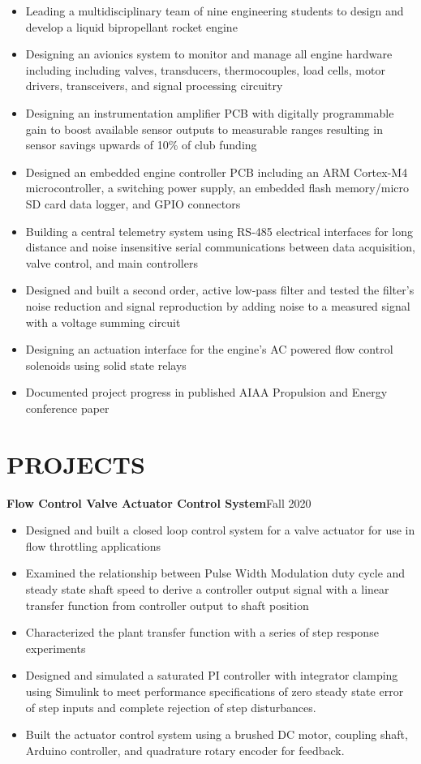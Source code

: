 \documentclass{article}
\begin{document}
\begin{itemize}
\item{Leading a multidisciplinary team of nine engineering students to design and develop a liquid bipropellant rocket engine}
	\item{Designing an avionics system to monitor and manage all engine hardware including including valves, transducers, thermocouples, load cells, motor drivers, transceivers, and signal processing circuitry}
	\item{Designing an instrumentation amplifier PCB with digitally programmable gain to boost available sensor outputs to measurable ranges resulting in sensor savings upwards of 10\% of club funding}
\item{Designed an embedded engine controller PCB including an ARM Cortex-M4 microcontroller, a switching power supply, an embedded flash memory/micro SD card data logger, and GPIO connectors}
	\item{Building a central telemetry system using RS-485 electrical interfaces for long distance and noise insensitive serial communications between data acquisition, valve control, and main controllers}
	\item{Designed and built a second order, active low-pass filter and tested the filter's noise reduction and signal reproduction by adding noise to a measured signal with a voltage summing circuit}
\item{Designing an actuation interface for the engine's AC powered flow control solenoids using solid state relays}
	\item{Documented project progress in published AIAA Propulsion and Energy conference paper}
\end{itemize}
\section{PROJECTS}
\vspace{0.5em}
\textbf{Flow Control Valve Actuator Control System}\hfill Fall 2020
\vspace{0.5em}
\begin{itemize}
	\item Designed and built a closed loop control system for a valve actuator for use in flow throttling applications
	\item Examined the relationship between Pulse Width Modulation duty cycle and steady state shaft speed to derive a controller output signal with a linear transfer function from controller output to shaft position  
	\item Characterized the plant transfer function with a series of step response experiments
	\item  Designed and simulated a saturated PI controller with integrator clamping using Simulink to meet performance specifications of zero steady state error of step inputs and complete rejection of step disturbances.
	\item  Built the actuator control system using a brushed DC motor, coupling shaft, Arduino controller, and quadrature rotary encoder for feedback.
\end{itemize}
\thispagestyle{empty}
\end{document}
